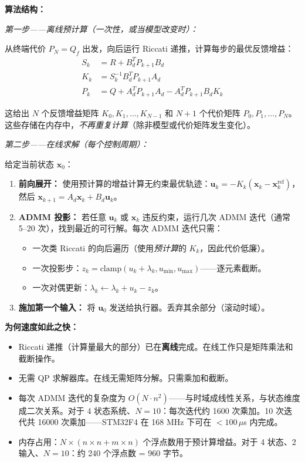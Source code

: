 \textbf{算法结构：}

\textit{第一步——离线预计算（一次性，或当模型改变时）：}

从终端代价 $P_N = Q_f$ 出发，向后运行 Riccati 递推，计算每步的最优反馈增益：
\begin{align}
S_k &= R + B_d^T P_{k+1} B_d \\
K_k &= S_k^{-1} B_d^T P_{k+1} A_d \\
P_k &= Q + A_d^T P_{k+1} A_d - A_d^T P_{k+1} B_d K_k
\end{align}

这给出 $N$ 个反馈增益矩阵 $K_0, K_1, \ldots, K_{N-1}$ 和 $N+1$ 个代价矩阵 $P_0, P_1, \ldots, P_N$。这些存储在内存中，\textit{不再重复计算}（除非模型或代价矩阵发生变化）。

\textit{第二步——在线求解（每个控制周期）：}

给定当前状态 $\mathbf{x}_0$：
\begin{enumerate}
    \item \textbf{前向展开：} 使用预计算的增益计算无约束最优轨迹：$\mathbf{u}_k = -K_k (\mathbf{x}_k - \mathbf{x}_k^{\text{ref}})$，然后 $\mathbf{x}_{k+1} = A_d \mathbf{x}_k + B_d \mathbf{u}_k$。
    \item \textbf{ADMM 投影：} 若任意 $\mathbf{u}_k$ 或 $\mathbf{x}_k$ 违反约束，运行几次 ADMM 迭代（通常 5--20 次），找到最近的可行解。每次 ADMM 迭代只需：
    \begin{itemize}[nosep]
        \item 一次类 Riccati 的向后遍历（使用\textit{预计算}的 $K_k$，因此代价低廉）。
        \item 一次投影步：$z_k = \text{clamp}(u_k + \lambda_k, u_{\min}, u_{\max})$——逐元素截断。
        \item 一次对偶更新：$\lambda_k \leftarrow \lambda_k + u_k - z_k$。
    \end{itemize}
    \item \textbf{施加第一个输入：} 将 $\mathbf{u}_0$ 发送给执行器。丢弃其余部分（滚动时域）。
\end{enumerate}

\textbf{为何速度如此之快：}
\begin{itemize}
    \item Riccati 递推（计算量最大的部分）已在\textbf{离线}完成。在线工作只是矩阵乘法和截断操作。
    \item 无需 QP 求解器库。在线无需矩阵分解。只需乘加和截断。
    \item 每次 ADMM 迭代的复杂度为 $O(N \cdot n^2)$——与时域成线性关系，与状态维度成二次关系。对于 4 状态系统、$N = 10$：每次迭代约 1600 次乘加。10 次迭代共 16000 次乘加——STM32F4 在 168 MHz 下可在 $< 100\,\mu$s 内完成。
    \item 内存占用：$N \times (n \times n + m \times n)$ 个浮点数用于预计算增益。对于 4 状态、2 输入、$N = 10$：约 240 个浮点数 = 960 字节。
\end{itemize}

